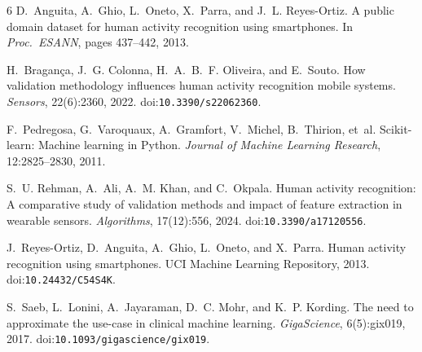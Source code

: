 \documentclass{article}
\begin{document}
{\small\setlength{\bibsep}{2pt}
\begin{thebibliography}{6}
D.~Anguita, A.~Ghio, L.~Oneto, X.~Parra, and J.~L. Reyes-Ortiz.
\newblock A public domain dataset for human activity recognition using smartphones.
\newblock In \emph{Proc.\ ESANN}, pages 437--442, 2013.

H.~Bragan{\c{c}}a, J.~G. Colonna, H.~A.~B.~F. Oliveira, and E.~Souto.
\newblock How validation methodology influences human activity recognition mobile systems.
\newblock \emph{Sensors}, 22(6):2360, 2022. doi:\nolinkurl{10.3390/s22062360}.

F.~Pedregosa, G.~Varoquaux, A.~Gramfort, V.~Michel, B.~Thirion, et~al.
\newblock Scikit-learn: Machine learning in {P}ython.
\newblock \emph{Journal of Machine Learning Research}, 12:2825--2830, 2011.

S.~U. Rehman, A.~Ali, A.~M. Khan, and C.~Okpala.
\newblock Human activity recognition: A comparative study of validation methods and impact of feature extraction in wearable sensors.
\newblock \emph{Algorithms}, 17(12):556, 2024. doi:\nolinkurl{10.3390/a17120556}.

J.~Reyes-Ortiz, D.~Anguita, A.~Ghio, L.~Oneto, and X.~Parra.
\newblock Human activity recognition using smartphones.
\newblock UCI Machine Learning Repository, 2013. doi:\nolinkurl{10.24432/C54S4K}.

S.~Saeb, L.~Lonini, A.~Jayaraman, D.~C. Mohr, and K.~P. Kording.
\newblock The need to approximate the use-case in clinical machine learning.
\newblock \emph{GigaScience}, 6(5):gix019, 2017. doi:\nolinkurl{10.1093/gigascience/gix019}.
\end{thebibliography}
}
\end{document}
